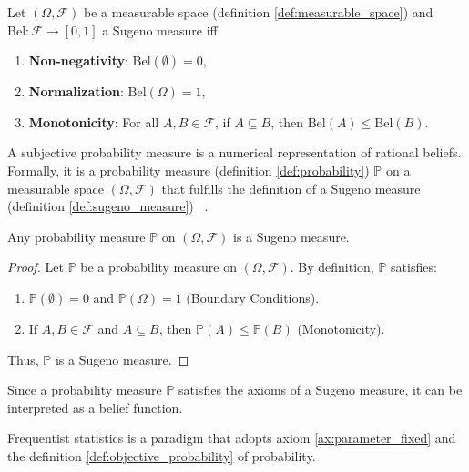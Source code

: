 \begin{definition}
	\label{def:sugeno_measure}
	Let $(\Omega, \mathcal{F})$ be a measurable space (definition \ref{def:measurable_space}) and $\text{Bel}: \mathcal{F} \to [0, 1]$ a Sugeno measure iff~\cite{shafer1987}
	\begin{enumerate}
		\item \textbf{Non-negativity}: $\text{Bel}(\emptyset) = 0$,
		\item \textbf{Normalization}: $\text{Bel}(\Omega) = 1$,
		\item \textbf{Monotonicity}: For all $A, B \in \mathcal{F}$, if $A \subseteq B$, then $\text{Bel}(A) \leq \text{Bel}(B)$.
	\end{enumerate}
\end{definition}

\begin{definition}
	\label{def:subjective_probability}
	A subjective probability measure is a numerical representation of rational beliefs. Formally, it is a probability measure (definition \ref{def:probability}) $\mathbb{P}$ on a measurable space $(\Omega, \mathcal{F})$ that fulfills the definition of a Sugeno measure (definition \ref{def:sugeno_measure}) ~\cite{shafer1987,hoff2009first}.
\end{definition}

\begin{theorem}
	Any probability measure $\mathbb{P}$ on $(\Omega, \mathcal{F})$ is a Sugeno measure.
\end{theorem}
\begin{proof}
	Let $\mathbb{P}$ be a probability measure on $(\Omega, \mathcal{F})$. By definition, $\mathbb{P}$ satisfies:
	\begin{enumerate}
		\item $\mathbb{P}(\emptyset) = 0$ and $\mathbb{P}(\Omega) = 1$ (Boundary Conditions).
		\item If $A, B \in \mathcal{F}$ and $A \subseteq B$, then $\mathbb{P}(A) \leq \mathbb{P}(B)$ (Monotonicity).
	\end{enumerate}
	Thus, $\mathbb{P}$ is a Sugeno measure.
\end{proof}

\begin{corollary}
	Since a probability measure $\mathbb{P}$ satisfies the axioms of a Sugeno measure, it can be interpreted as a belief function.
\end{corollary}


\begin{definition}
	Frequentist statistics is a paradigm that adopts axiom \ref{ax:parameter_fixed} and the definition \ref{def:objective_probability} of probability. 
\end{definition}

